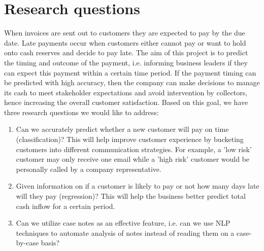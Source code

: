 \documentclass{article}
\begin{document}
\section{Research questions}
 When invoices are sent out to customers they are expected to pay by the due date.  Late payments occur when customers either cannot pay or want to hold onto cash reserves and decide to pay late.  The aim of this project is to predict the timing and outcome of the payment, i.e. informing business leaders if they can expect this payment within a certain time period. If the payment timing can be predicted with high accuracy, then the company can make decisions to manage its cash to meet stakeholder expectations and avoid intervention by collectors, hence increasing the overall customer satisfaction. Based on this goal, we have three research questions we would like to address: 
 
\begin{enumerate}


    
    

    \item Can we accurately predict whether a new customer will pay on time (classification)? This will help improve customer experience by bucketing customers into different communication strategies. For example, a 'low risk' customer may only receive one email while a 'high risk' customer would be personally called by a company representative.
    
    \item Given information on if a customer is likely to pay or not how many days late will they pay (regression)? This will help the business better predict total cash inflow for a certain period. 
    
    \item Can we utilize case notes as an effective feature, i.e. can we use NLP techniques to automate analysis of notes instead of reading them on a case-by-case basis?
       
\end{enumerate}
\end{document}
